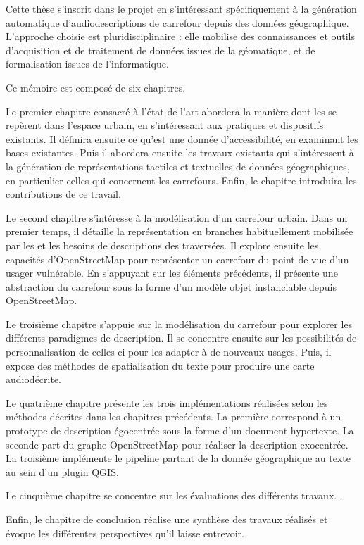 
\newpar{}

Cette thèse s'inscrit dans le projet en s'intéressant spécifiquement à la génération automatique d'audiodescriptions de carrefour depuis des données géographique. L'approche choisie est pluridisciplinaire : elle mobilise des connaissances et outils d'acquisition et de traitement de données issues de la géomatique, et de formalisation issues de l'informatique.

\newpar{}

Ce mémoire est composé de six chapitres.

Le premier chapitre consacré à l'état de l'art abordera la manière dont les \pcdvs{} se repèrent dans l'espace urbain, en s'intéressant aux pratiques et dispositifs existants. Il définira ensuite ce qu'est une donnée d'accessibilité, en examinant les bases existantes. Puis il abordera ensuite les travaux existants qui s'intéressent à la génération de représentations tactiles et textuelles de données géographiques, en particulier celles qui concernent les carrefours. Enfin, le chapitre introduira les contributions de ce travail.

Le second chapitre s'intéresse à la modélisation d'un carrefour urbain. Dans un premier temps, il détaille la représentation en branches habituellement mobilisée par les \pcdvs{} et les besoins de descriptions des traversées. Il explore ensuite les capacités d'OpenStreetMap pour représenter un carrefour du point de vue d'un usager vulnérable. En s'appuyant sur les éléments précédents, il présente une abstraction du carrefour sous la forme d'un modèle objet instanciable depuis OpenStreetMap.

Le troisième chapitre s'appuie sur la modélisation du carrefour pour explorer les différents paradigmes de description. Il se concentre ensuite sur les possibilités de personnalisation de celles-ci pour les adapter à de nouveaux usages. Puis, il expose des méthodes de spatialisation du texte pour produire une carte audiodécrite.

Le quatrième chapitre présente les trois implémentations réalisées selon les méthodes décrites dans les chapitres précédents. La première correspond à un prototype de description égocentrée sous la forme d'un document hypertexte. La seconde part du graphe OpenStreetMap pour réaliser la description exocentrée. La troisième implémente le pipeline partant de la donnée géographique au texte au sein d'un plugin QGIS.

Le cinquième chapitre se concentre sur les évaluations des différents travaux. \todo{}.

Enfin, le chapitre de conclusion réalise une synthèse des travaux réalisés et évoque les différentes perspectives qu'il laisse entrevoir.

